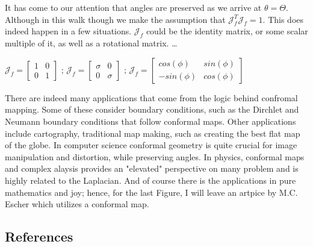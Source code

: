 \documentclass[a4paper,man,natbib]{apa6}
\begin{document}
It has come to our attention that angles are preserved as we arrive at $ \theta = \Theta $.
Although in this walk though we make the assumption that $ \mathcal{J}_f^T\mathcal{J}_f = 1 $.
This does indeed happen in a few situations. $ \mathcal{J}_f $ could be the identity matrix, or some scalar multiple of it, as well as a rotational matrix. \dots

\begin{center}

$ \mathcal{J}_f = \begin{bmatrix}
        1 & 0\\
        0 & 1
\end{bmatrix} $ ;
$ \mathcal{J}_f = \begin{bmatrix}
      \sigma  & 0\\
      0 & \sigma
\end{bmatrix} $ ;
$ \mathcal{J}_f = \begin{bmatrix}
      cos(\phi) & sin(\phi)\\
      -sin(\phi) & cos(\phi)
\end{bmatrix} $

\end{center}

There are indeed many applications that come from the logic behind confromal mapping.
Some of these consider boundary conditions, such as the Dirchlet and Neumann boundary conditions that follow conformal maps.
Other applications include cartography, traditional map making, such as creating the best flat map of the globe.
In computer science conformal geometry is quite crucial for image manipulation and distortion, while preserving angles.
In physics, conformal maps and complex alaysis provides an "elevated" perspective on many problem and is highly related to the Laplacian.
And of course there is the applications in pure mathematics and joy; hence, for the last Figure, I will leave an artpice by M.C. Escher which utilizes a conformal map.

\newpage
\subsection{References}
\end{document}
